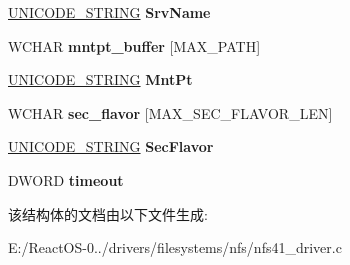 \begin{DoxyCompactItemize}
\item 
\mbox{\label{struct___n_f_s41___m_o_u_n_t___c_o_n_f_i_g_aa077c411947428e0b4c0cbcb578a8f55}} 
\hyperlink{struct___u_n_i_c_o_d_e___s_t_r_i_n_g}{U\+N\+I\+C\+O\+D\+E\+\_\+\+S\+T\+R\+I\+NG} {\bfseries Srv\+Name}
\item 
\mbox{\label{struct___n_f_s41___m_o_u_n_t___c_o_n_f_i_g_abaf0e7a809a655e54ff5f09c334ca1da}} 
W\+C\+H\+AR {\bfseries mntpt\+\_\+buffer} \mbox{[}M\+A\+X\+\_\+\+P\+A\+TH\mbox{]}
\item 
\mbox{\label{struct___n_f_s41___m_o_u_n_t___c_o_n_f_i_g_a65fb8856033475adfd7609e36417c77e}} 
\hyperlink{struct___u_n_i_c_o_d_e___s_t_r_i_n_g}{U\+N\+I\+C\+O\+D\+E\+\_\+\+S\+T\+R\+I\+NG} {\bfseries Mnt\+Pt}
\item 
\mbox{\label{struct___n_f_s41___m_o_u_n_t___c_o_n_f_i_g_a91bc38f3b5a69714abf4857777a1afac}} 
W\+C\+H\+AR {\bfseries sec\+\_\+flavor} \mbox{[}M\+A\+X\+\_\+\+S\+E\+C\+\_\+\+F\+L\+A\+V\+O\+R\+\_\+\+L\+EN\mbox{]}
\item 
\mbox{\label{struct___n_f_s41___m_o_u_n_t___c_o_n_f_i_g_a8067bcf03f5610154afa177519766d80}} 
\hyperlink{struct___u_n_i_c_o_d_e___s_t_r_i_n_g}{U\+N\+I\+C\+O\+D\+E\+\_\+\+S\+T\+R\+I\+NG} {\bfseries Sec\+Flavor}
\item 
\mbox{\label{struct___n_f_s41___m_o_u_n_t___c_o_n_f_i_g_a3f659ca673c661805e4530a00e45b241}} 
D\+W\+O\+RD {\bfseries timeout}
\end{DoxyCompactItemize}


该结构体的文档由以下文件生成\+:\begin{DoxyCompactItemize}
\item 
E\+:/\+React\+O\+S-\/0../drivers/filesystems/nfs/nfs41\+\_\+driver.\+c\end{DoxyCompactItemize}
